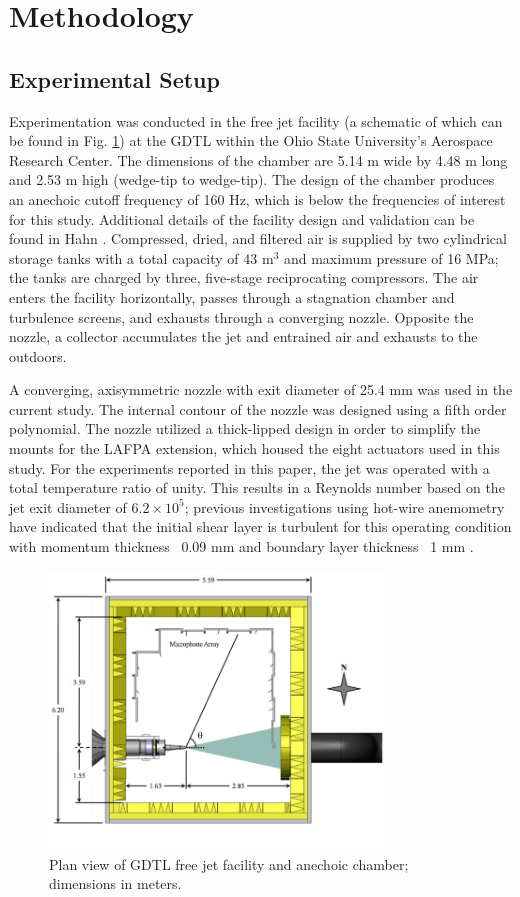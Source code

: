 \documentclass[english]{aiaa-tc}
\begin{document}
\section{Methodology}
\subsection{Experimental Setup\label{expersetup}}
Experimentation was conducted in the free jet facility (a schematic of which can be found in Fig. \ref{GDTLschematic}) at the GDTL within the Ohio State University's Aerospace Research Center.
The dimensions of the chamber are 5.14 m wide by 4.48 m long and 2.53 m high (wedge-tip to wedge-tip).
The design of the chamber produces an anechoic cutoff frequency of 160 Hz, which is below the frequencies of interest for this study.
Additional details of the facility design and validation can be found in Hahn \cite{Hahn2011}.
Compressed, dried, and filtered air is supplied by two cylindrical storage tanks with a total capacity of 43 m$^3$ and maximum pressure of 16 MPa; the tanks are charged by three, five-stage reciprocating compressors.
The air enters the facility horizontally, passes through a stagnation chamber and turbulence screens, and exhausts through a converging nozzle.
Opposite the nozzle, a collector accumulates the jet and entrained air and exhausts to the outdoors.

A converging, axisymmetric nozzle with exit diameter of 25.4 mm was used in the current study.
The internal contour of the nozzle was designed using a fifth order polynomial. The nozzle utilized a thick-lipped design in order to simplify the mounts for the LAFPA extension, which housed the eight actuators used in this study.
For the experiments reported in this paper, the jet was operated with a total temperature ratio of unity.
This results in a Reynolds number based on the jet exit diameter of $6.2 \times 10^{5}$; previous investigations using hot-wire anemometry have indicated that the initial shear layer is turbulent for this operating condition with momentum thickness ~0.09 mm and boundary layer thickness ~1 mm \cite{kfm2009-1}.
\begin{figure}
	\begin{center}
		\includegraphics[width=3.5in]{GDTL_facility_schematic.png}
		\caption{Plan view of GDTL free jet facility and anechoic chamber; dimensions in meters.}\label{GDTLschematic}
	\end{center}
\end{figure}
	
\end{document}
